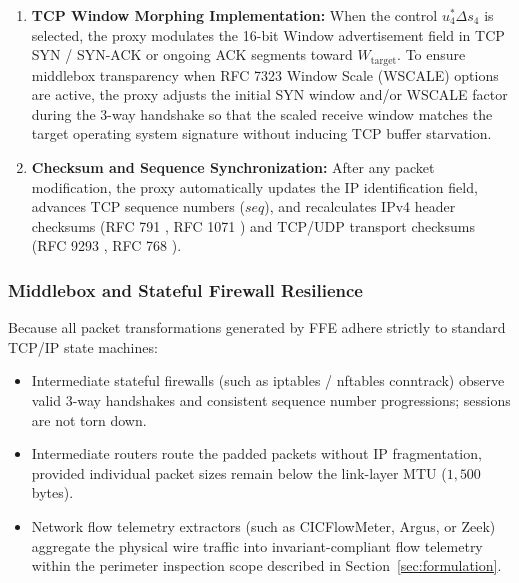 \documentclass[pdflatex,sn-mathphys-num]{sn-jnl}
\theoremstyle{thmstyleone}
\theoremstyle{thmstyletwo}
\theoremstyle{thmstylethree}
\begin{document}
\begin{enumerate}
    \item \textbf{TCP Window Morphing Implementation:} When the control $u_4^* \Delta s_4$ is selected, the proxy modulates the 16-bit Window advertisement field in TCP SYN / SYN-ACK or ongoing ACK segments toward $W_{\text{target}}$. To ensure middlebox transparency when RFC 7323 \cite{rfc7323} Window Scale (WSCALE) options are active, the proxy adjusts the initial SYN window and/or WSCALE factor during the 3-way handshake so that the scaled receive window matches the target operating system signature without inducing TCP buffer starvation.
    \item \textbf{Checksum and Sequence Synchronization:} After any packet modification, the proxy automatically updates the IP identification field, advances TCP sequence numbers ($seq$), and recalculates IPv4 header checksums (RFC 791 \cite{rfc791}, RFC 1071 \cite{rfc1071}) and TCP/UDP transport checksums (RFC 9293 \cite{rfc9293}, RFC 768 \cite{rfc768}).
\end{enumerate}

\subsubsection{Middlebox and Stateful Firewall Resilience}
Because all packet transformations generated by FFE adhere strictly to standard TCP/IP state machines:
\begin{itemize}
    \item Intermediate stateful firewalls (such as iptables / nftables conntrack) observe valid 3-way handshakes and consistent sequence number progressions; sessions are not torn down.
    \item Intermediate routers route the padded packets without IP fragmentation, provided individual packet sizes remain below the link-layer MTU ($1,500$ bytes).
    \item Network flow telemetry extractors (such as CICFlowMeter, Argus, or Zeek) aggregate the physical wire traffic into invariant-compliant flow telemetry within the perimeter inspection scope described in Section~\ref{sec:formulation}.
\end{itemize}
\end{document}
